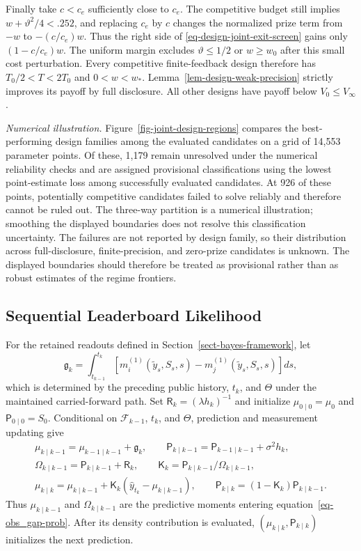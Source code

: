 \documentclass[mnsc]{informs3}
\begin{document}
\begin{APPENDICES}
{Finally take $c<c_e$ sufficiently close to $c_e$.
The competitive budget still implies $w+{\vartheta}^2/4<.252$,
and replacing $c_e$ by $c$ changes the normalized prize term from
$-w$ to $-(c/c_e)w$. Thus the right side of
\eqref{eq-design-joint-exit-screen} gains only $(1-c/c_e)w$.
The uniform margin excludes ${\vartheta}\leq1/2$ or $w\geq w_0$
after this small cost perturbation.
Every competitive finite-feedback design therefore has
$T_0/2<T<2T_0$ and $0<w<w_*$.
Lemma~\ref{lem-design-weak-precision} strictly improves its payoff
by full disclosure. All other designs have payoff below
$V_0\leq V_\infty$.
\Halmos
\endproof

}

\emph{Numerical illustration.}
Figure~\ref{fig-joint-design-regions} compares the best-performing design families among the evaluated candidates on a grid of 14,553 parameter points. Of these, 1,179 remain unresolved under the numerical reliability checks and are assigned provisional classifications using the lowest point-estimate loss among successfully evaluated candidates. At 926 of these points, potentially competitive candidates failed to solve reliably and therefore cannot be ruled out. The three-way partition is a numerical illustration; smoothing the displayed boundaries does not resolve this classification uncertainty.
{The failures are not reported by design family, so their distribution across full-disclosure, finite-precision, and zero-prize candidates is unknown. The displayed boundaries should therefore be treated as provisional rather than as robust estimates of the regime frontiers.}

\subsection{Sequential Leaderboard Likelihood}\label{app-leaderboard-recursion}

For the retained readouts defined in Section~\ref{sect-bayes-framework}, let
\[
\mathfrak g_k=\int_{t_{k-1}}^{t_k}
\left[m_i^{(1)}(\tilde y_s,S_s,s)-m_j^{(1)}(\tilde y_s,S_s,s)\right]ds,
\]
which is determined by the preceding public history, $t_k$, and $\Theta$ under the maintained carried-forward path. Set $\mathsf R_k=(\lambda h_k)^{-1}$ and initialize $\mu_{0\mid0}=\mu_0$ and $\mathsf P_{0\mid0}=S_0$. Conditional on $\mathcal F_{k-1}$, $t_k$, and $\Theta$, prediction and measurement updating give
\[
\begin{gathered}
\mu_{k\mid k-1}=\mu_{k-1\mid k-1}+\mathfrak g_k,\qquad
\mathsf P_{k\mid k-1}=\mathsf P_{k-1\mid k-1}+\sigma^2h_k,\\
\Omega_{k\mid k-1}=\mathsf P_{k\mid k-1}+\mathsf R_k,\qquad
\mathsf K_k=\mathsf P_{k\mid k-1}/\Omega_{k\mid k-1},\\
\mu_{k\mid k}=\mu_{k\mid k-1}
+\mathsf K_k(\hat y_{t_k}-\mu_{k\mid k-1}),\qquad
\mathsf P_{k\mid k}=(1-\mathsf K_k)\mathsf P_{k\mid k-1}.
\end{gathered}
\]
Thus $\mu_{k\mid k-1}$ and $\Omega_{k\mid k-1}$ are the predictive moments entering equation~\eqref{eq-obs_gap-prob}. After its density contribution is evaluated, $(\mu_{k\mid k},\mathsf P_{k\mid k})$ initializes the next prediction.


\end{APPENDICES}
\end{document}
